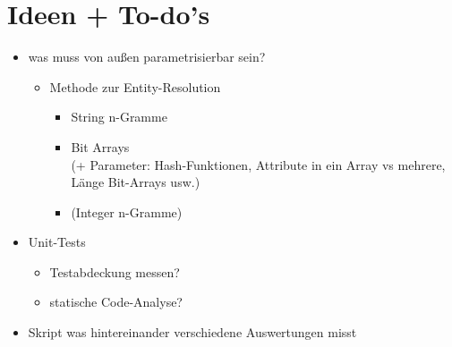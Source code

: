 \section{Ideen + To-do's}

\begin{itemize}
	\item was muss von außen parametrisierbar sein?
	\begin{itemize}
		\item Methode zur Entity-Resolution
		\begin{itemize}
			\item String n-Gramme
			\item Bit Arrays\\ (+ Parameter: Hash-Funktionen, Attribute in ein Array vs mehrere, Länge Bit-Arrays usw.)
			\item (Integer n-Gramme)
		\end{itemize}
	\end{itemize}
	\item Unit-Tests
	\begin{itemize}
		\item Testabdeckung messen?
		\item statische Code-Analyse?
	\end{itemize}
	\item Skript was hintereinander verschiedene Auswertungen misst
\end{itemize}
